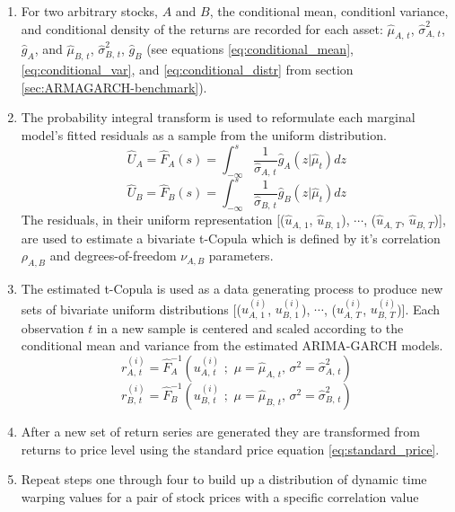\documentclass[12pt]{article}
\begin{document}
\begin{enumerate}
    \item For two arbitrary stocks, $A$ and $B$, the conditional mean, conditionl variance, and conditional density of the returns are recorded for each asset: $\hat{\mu}_{A,\,t}$, $\hat{\sigma}^{2}_{A,\,t}$, $\hat{g}_{A}$, and $\hat{\mu}_{B,\,t}$, $\hat{\sigma}^{2}_{B,\,t}$, $\hat{g}_{B}$ (see equations \ref{eq:conditional_mean}, \ref{eq:conditional_var}, and \ref{eq:conditional_distr} from section \ref{sec:ARMAGARCH-benchmark}).
    \item The probability integral transform is used to reformulate each marginal model's fitted residuals as a sample from the uniform distribution.
    \begin{equation} \label{eq:MC_F_distr_A}
        \hat{U}_{A} = \hat{F}_{A}(s) = \int_{-\infty}^{s} \frac{1}{\hat{\sigma}_{A,\,t}} \hat{g}_{A} \left(z | \hat{\mu}_{t}\right) dz
    \end{equation}
    \begin{equation} \label{eq:MC_F_distr_B}
        \hat{U}_{B} = \hat{F}_{B}(s) = \int_{-\infty}^{s} \frac{1}{\hat{\sigma}_{B,\,t}} \hat{g}_{B} \left(z | \hat{\mu}_{t}\right) dz
    \end{equation}
    The residuals, in their uniform representation [($\hat{u}_{A,\,1}$, $\hat{u}_{B,\,1}$), $\cdots$, ($\hat{u}_{A,\,T}$, $\hat{u}_{B,\,T}$)], are used to estimate a bivariate t-Copula which is defined by it's correlation $\rho_{A,B}$ and degrees-of-freedom $\nu_{A,B}$ parameters.
    \item The estimated t-Copula is used as a data generating process to produce new sets of bivariate uniform distributions [($u^{(i)}_{A,\,1}$, $u^{(i)}_{B,\,1}$), $\cdots$, ($u^{(i)}_{A,\,T}$, $u^{(i)}_{B,\,T}$)]. Each observation $t$ in a new sample is centered and scaled according to the conditional mean and variance from the estimated ARIMA-GARCH models.
    \begin{equation} \label{eq:MC_invF_distr_A}
        r^{(i)}_{A,\,t} = \hat{F}^{-1}_{A} \left(u^{(i)}_{A,\,t}\,\,;\,\, \mu=\hat{\mu}_{A,\,t},\, \sigma^{2}=\hat{\sigma}^{2}_{A,\,t} \right)
    \end{equation}
    \begin{equation} \label{eq:MC_invF_distr_B}
        r^{(i)}_{B,\,t} = \hat{F}^{-1}_{B} \left(u^{(i)}_{B,\,t}\,\,;\,\, \mu=\hat{\mu}_{B,\,t},\, \sigma^{2}=\hat{\sigma}^{2}_{B,\,t} \right)
    \end{equation}
    \item After a new set of return series are generated they are transformed from returns to price level using the standard price equation \ref{eq:standard_price}.
    \item Repeat steps one through four to build up a distribution of dynamic time warping values for a pair of stock prices with a specific correlation value
\end{enumerate}
\end{document}
